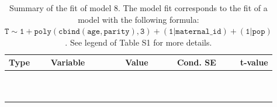 \begin{table}

\caption{\label{tab:tab8}Summary of the fit of model 8. The model fit corresponds to the fit of a model with the following formula: {\small$\mathtt{T \sim 1 + poly(cbind(age, parity), 3) + (1 | maternal\_id) + (1 | pop)}$}. See legend of Table S1 for more details.}
\centering
\fontsize{8}{10}\selectfont
\begin{tabular}[t]{>{\raggedright\arraybackslash}p{3cm}>{\raggedright\arraybackslash}p{5cm}rrr}
\toprule
Type & Variable & Value & Cond. SE & t-value\\
\midrule
\cellcolor{gray!6}{fixed effects} & \cellcolor{gray!6}{$\beta_1$} & \cellcolor{gray!6}{-4.1} & \cellcolor{gray!6}{0.113} & \cellcolor{gray!6}{-36.4}\\
\cellcolor{gray!6}{} & \cellcolor{gray!6}{$\beta_{\mathtt{age}}$} & \cellcolor{gray!6}{73.7} & \cellcolor{gray!6}{31.1} & \cellcolor{gray!6}{2.37}\\
\cellcolor{gray!6}{} & \cellcolor{gray!6}{$\beta_{\mathtt{age}^2}$} & \cellcolor{gray!6}{-61.2} & \cellcolor{gray!6}{17.2} & \cellcolor{gray!6}{-3.55}\\
\cellcolor{gray!6}{} & \cellcolor{gray!6}{$\beta_{\mathtt{age}^3}$} & \cellcolor{gray!6}{-47.1} & \cellcolor{gray!6}{16.4} & \cellcolor{gray!6}{-2.87}\\
\cellcolor{gray!6}{} & \cellcolor{gray!6}{$\beta_{\mathtt{parity}}$} & \cellcolor{gray!6}{-0.936} & \cellcolor{gray!6}{40.1} & \cellcolor{gray!6}{-0.0233}\\
\cellcolor{gray!6}{} & \cellcolor{gray!6}{$\beta_{\mathtt{age}\times\mathtt{parity}}$} & \cellcolor{gray!6}{-4006} & \cellcolor{gray!6}{11890} & \cellcolor{gray!6}{-0.337}\\
\cellcolor{gray!6}{} & \cellcolor{gray!6}{$\beta_{\mathtt{age}^2\times\mathtt{parity}}$} & \cellcolor{gray!6}{7710} & \cellcolor{gray!6}{8669} & \cellcolor{gray!6}{0.889}\\
\cellcolor{gray!6}{} & \cellcolor{gray!6}{$\beta_{\mathtt{parity}^2}$} & \cellcolor{gray!6}{19} & \cellcolor{gray!6}{27.3} & \cellcolor{gray!6}{0.694}\\
\cellcolor{gray!6}{} & \cellcolor{gray!6}{$\beta_{\mathtt{age}\times\mathtt{parity}^2}$} & \cellcolor{gray!6}{-4380} & \cellcolor{gray!6}{8121} & \cellcolor{gray!6}{-0.539}\\
\cellcolor{gray!6}{} & \cellcolor{gray!6}{$\beta_{\mathtt{parity}^3}$} & \cellcolor{gray!6}{-18.6} & \cellcolor{gray!6}{14.1} & \cellcolor{gray!6}{-1.32}\\

\end{tabular}
\end{table}

